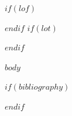 \documentclass{abntex2}
\begin{document}
\imprimircapa
\imprimirfolhaderosto*

\tableofcontents*
$if(lof)$\listoffigures*$endif$
$if(lot)$\listoftables*$endif$

$body$

$if(bibliography)$


$endif$
\end{document}
